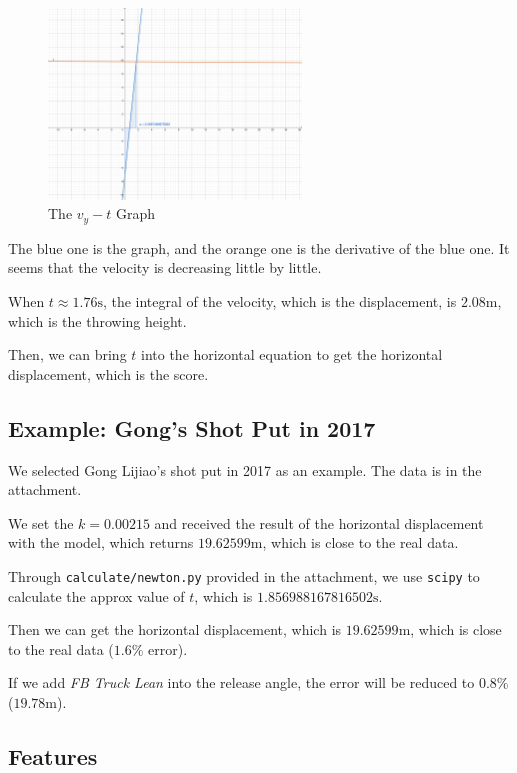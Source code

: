 \documentclass{article}
\begin{document}
\begin{figure}[H]
    \centering
    \includegraphics[width=0.6\textwidth]{figures/figure-1.pdf}
    \caption{The $v_y-t$ Graph}
    \label{fig:vy-t}
\end{figure}

The blue one is the graph, and the orange one is the derivative of the blue one. It seems that the velocity is decreasing little by little.

When $t \approx 1.76 \si{\second}$, the integral of the velocity, which is the displacement, is $2.08 \si{\meter}$, which is the throwing height.

Then, we can bring $t$ into the horizontal equation to get the horizontal displacement, which is the score.

\subsection{Example: Gong's Shot Put in 2017}

We selected Gong Lijiao's shot put in 2017 as an example. The data is in the attachment.

We set the $k = 0.00215$ and received the result of the horizontal displacement with the model, which returns $19.62599 \si{\meter}$, which is close to the real data.

Through \texttt{calculate/newton.py} provided in the attachment, we use \texttt{scipy} to calculate the approx value of $t$, which is $1.856988167816502 \si{\second}$.

Then we can get the horizontal displacement, which is $19.62599 \si{\meter}$, which is close to the real data ($1.6\%$ error).

If we add \textit{FB Truck Lean} into the release angle, the error will be reduced to $0.8\%$ ($19.78 \si{\meter}$).

\subsection{Features}
\end{document}
